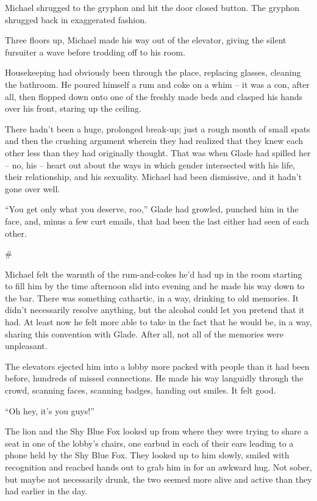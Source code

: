 \documentclass[12pt,letterpaper,oneside]{memoir}
\newcommand\secdiv{
  \begin{center}
    \#
  \end{center}
}
\begin{document}
  Michael shrugged to the gryphon and hit the door closed button.  The gryphon shrugged back in exaggerated fashion.

  Three floors up, Michael made his way out of the elevator, giving the silent fursuiter a wave before trodding off to his room.

  Housekeeping had obviously been through the place, replacing glasses, cleaning the bathroom.  He poured himself a rum and coke on a whim -- it was a con, after all, then flopped down onto one of the freshly made beds and clasped his hands over his front, staring up the ceiling.

  There hadn't been a huge, prolonged break-up; just a rough month of small spats and then the crushing argument wherein they had realized that they knew each other less than they had originally thought.  That was when Glade had spilled her -- no, his -- heart out about the ways in which gender intersected with his life, their relationship, and his sexuality.  Michael had been dismissive, and it hadn't gone over well.

  ``You get only what you deserve, roo,'' Glade had growled, punched him in the face, and, minus a few curt emails, that had been the last either had seen of each other.

  \secdiv

  Michael felt the warmth of the rum-and-cokes he'd had up in the room starting to fill him by the time afternoon slid into evening and he made his way down to the bar. There was something cathartic, in a way, drinking to old memories.  It didn't necessarily resolve anything, but the alcohol could let you pretend that it had.  At least now he felt more able to take in the fact that he would be, in a way, sharing this convention with Glade.  After all, not all of the memories were unpleasant.

  The elevators ejected him into a lobby more packed with people than it had been before, hundreds of missed connections.  He made his way languidly through the crowd, scanning faces, scanning badges, handing out smiles.  It felt good.

  ``Oh hey, it's you guys!''

  The lion and the Shy Blue Fox looked up from where they were trying to share a seat in one of the lobby's chairs, one earbud in each of their ears leading to a phone held by the Shy Blue Fox.  They looked up to him slowly, smiled with recognition and reached hands out to grab him in for an awkward hug.  Not sober, but maybe not necessarily drunk, the two seemed more alive and active than they had earlier in the day.
\end{document}
